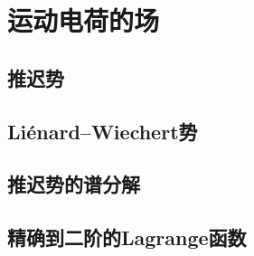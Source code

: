 \chapter{运动电荷的场}

\section{推迟势}

\section{Li\'{e}nard–Wiechert势}

\section{推迟势的谱分解}

\section{精确到二阶的Lagrange函数}